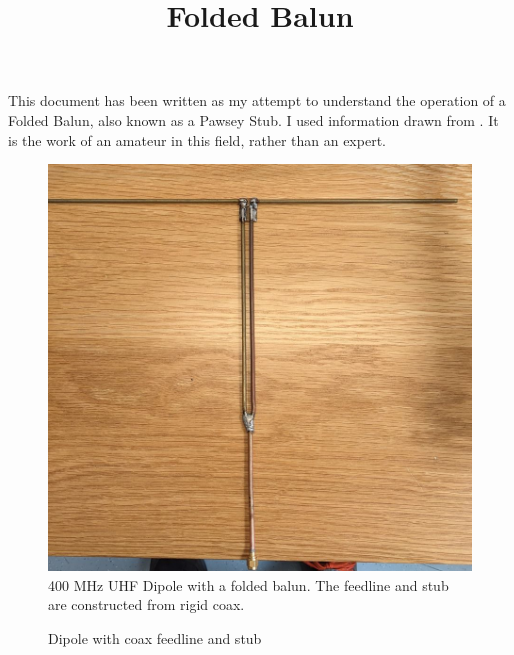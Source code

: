 \documentclass{article}
\begin{document}
\title{Folded Balun}
\maketitle

This document has been written as my attempt to understand the operation of a Folded Balun, also known as a Pawsey Stub.  I used information drawn from \cite{stack_exchange}\cite{antenna_theory}\cite{duffey}.  It is the work of an amateur in this field, rather than an expert.

\begin{figure}[h]
\caption{400 MHz UHF Dipole with a folded balun. The feedline and stub are constructed from rigid coax.}
\label{fig:uhf_diople}
\begin{center}
\includegraphics{uhf_dipole.jpg}
\end{center}
\end{figure}

\begin{figure}[h]

\caption{Dipole with coax feedline and stub}
\label{fig:assembly}
\vspace{5mm}
\centering
{}
\end{figure}
\end{document}
